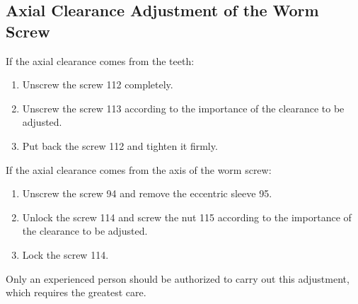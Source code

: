 \subsection*{Axial Clearance Adjustment of the Worm Screw}
If the axial clearance comes from the teeth:
\begin{enumerate}[label=\arabic*.]
    \item Unscrew the screw 112 completely.
    \item Unscrew the screw 113 according to the importance of the clearance to be adjusted.
    \item Put back the screw 112 and tighten it firmly.
\end{enumerate}

If the axial clearance comes from the axis of the worm screw:
\begin{enumerate}[label=\arabic*.]
    \item Unscrew the screw 94 and remove the eccentric sleeve 95.
    \item Unlock the screw 114 and screw the nut 115 according to the importance of the clearance to be adjusted.
    \item Lock the screw 114.
\end{enumerate}

Only an experienced person should be authorized to carry out this adjustment, which requires the greatest care.
